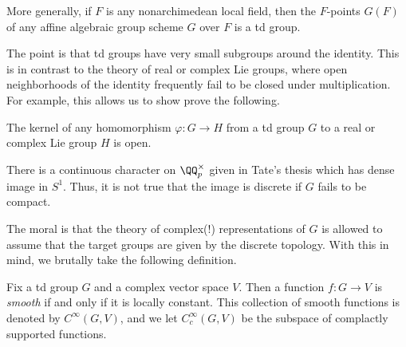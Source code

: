 \documentclass{article}
\begin{document}
\begin{example}
	More generally, if $F$ is any nonarchimedean local field, then the $F$-points $G(F)$ of any affine algebraic group scheme $G$ over $F$ is a td group.
\end{example}
The point is that td groups have very small subgroups around the identity. This is in contrast to the theory of real or complex Lie groups, where open neighborhoods of the identity frequently fail to be closed under multiplication. For example, this allows us to show prove the following.
\begin{lemma}
	The kernel of any homomorphism $\varphi\colon G\to H$ from a td group $G$ to a real or complex Lie group $H$ is open.
\end{lemma}
\begin{remark}
	There is a continuous character on $\QQ_p^\times$ given in Tate's thesis which has dense image in $S^1$. Thus, it is not true that the image is discrete if $G$ fails to be compact.
\end{remark}
The moral is that the theory of complex(!) representations of $G$ is allowed to assume that the target groups are given by the discrete topology. With this in mind, we brutally take the following definition.
\begin{definition}[smooth]
	Fix a td group $G$ and a complex vector space $V$. Then a function $f\colon G\to V$ is \textit{smooth} if and only if it is locally constant. This collection of smooth functions is denoted by $C^\infty(G,V)$, and we let $C^\infty_c(G,V)$ be the subspace of complactly supported functions.
\end{definition}
\end{document}
